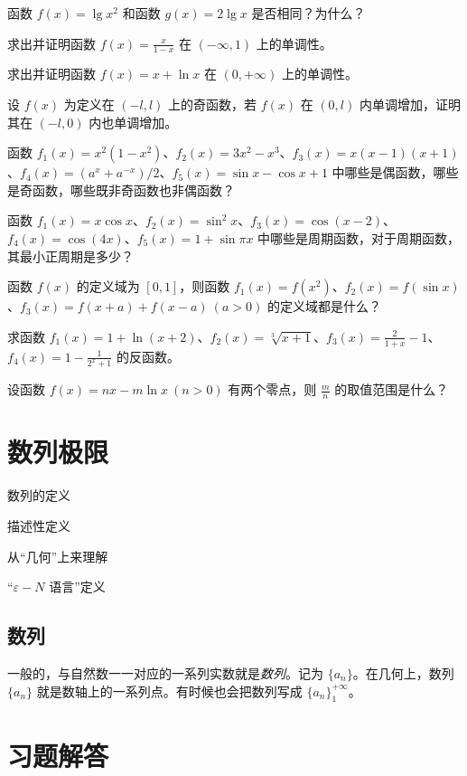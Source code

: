 \documentclass[lang=cn,10pt]{elegantbook}
\begin{document}
\begin{problemset}
  \item 函数 $f(x) = \lg x^2$ 和函数 $g(x) = 2 \lg x$ 是否相同？为什么？
  \item 求出并证明函数 $f(x) = \frac{x}{1-x}$ 在 $(-\infty, 1)$ 上的单调性。
  \item 求出并证明函数 $f(x) = x + \ln x$ 在 $(0, +\infty)$ 上的单调性。
  \item 设 $f(x)$ 为定义在 $(-l, l)$ 上的奇函数，若 $f(x)$ 在 $(0,l)$ 内单调增加，证明其在 $(-l, 0)$ 内也单调增加。
  \item 函数 $f_1(x) = x^2(1-x^2)$、$f_2(x) = 3x^2 - x^3$、$f_3(x) = x(x-1)(x+1)$、$f_4(x) = (a^x + a^{-x})/2$、$f_5(x) = \sin x - \cos x + 1$ 中哪些是偶函数，哪些是奇函数，哪些既非奇函数也非偶函数？
  \item 函数 $f_1(x) = x \cos x$、$f_2(x) = \sin^2 x$、$f_3(x) = \cos(x-2)$、$f_4(x) = \cos (4x)$、$f_5(x) = 1 + \sin \pi x$ 中哪些是周期函数，对于周期函数，其最小正周期是多少？
  \item 函数 $f(x)$ 的定义域为 $[0,1]$，则函数 $f_1(x)=f(x^2)$、$f_2(x)=f(\sin x)$、$f_3(x)=f(x+a) + f(x-a)\ (a>0)$ 的定义域都是什么？
  \item 求函数 $f_1(x) = 1 + \ln(x+2)$、$f_2(x) = \sqrt[3]{x+1}$、$f_3(x) = \frac{2}{1+x}-1$、$f_4(x) = 1-\frac{1}{2^x + 1}$ 的反函数。
  \item 设函数 $f(x) = nx - m \ln x \ (n>0)$ 有两个零点，则 $\frac mn$ 的取值范围是什么？ 
\end{problemset}

\chapter{数列极限}

\begin{introduction}
  \item 数列的定义
  \item 描述性定义
  \item 从“几何”上来理解
  \item “$\varepsilon-N$ 语言”定义
\end{introduction}
\section{数列}
一般的，与自然数一一对应的一系列实数就是\emph{数列}。记为 \emph{$\{a_n\}$}。在几何上，数列 $\{a_n\}$ 就是数轴上的一系列点。有时候也会把数列写成 $\{a_n\}_1^{+\infty}$。

\chapter{习题解答}
\end{document}
